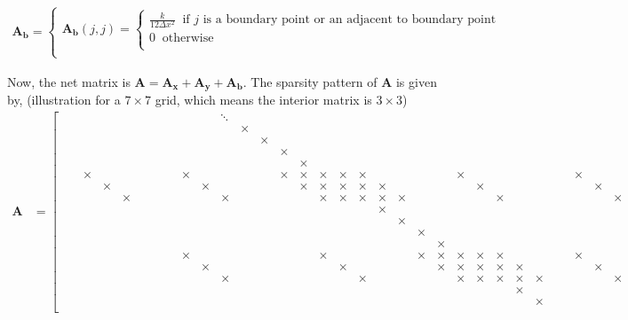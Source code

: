 \documentclass[12 pt, final]{article}
\renewcommand{\d}{\times}
\begin{document}
\begin{itemize}
\begin{itemize}
\begin{enumerate}
\begin{align*}
                    \mathbf{A_b} = \begin{cases}
                    \mathbf{A_b}(j,j) =
                    \begin{cases}
                    \frac{k}{12\Delta x^2} \: \text{ if $j$ is a boundary point or an adjacent to boundary point}\:\\
                    0 \: \text{ otherwise}\:\\
                    \end{cases}\\
                    \end{cases}
            \end{align*}

            Now, the net matrix is $\mathbf{A} = \mathbf{A_x}+\mathbf{A_y}+\mathbf{A_b}$. The sparsity pattern of $\mathbf{A}$ is given by, (illustration for a $7\times7$ grid, which means the interior matrix is $3\times3$)
            \begin{align*}
                \mathbf{A} &= \left[\begin{smallmatrix} 
                &&&&&&&&&&& \ddots\\
                &&&&&&&&&&&& \d\\
                &&&&&&&&&&&&& \d\\
                &&&&&&&&&&&&&& \d\\
                &&&&&&&&&&&&&&& \d\\
                &&\d&&&&&&&\d&&&&&\d&\d&\d&\d&\d&&&&&\d&&&&&&&\d \\
                &&&\d&&&&&&&\d&&&&&\d&\d&\d&\d&\d&&&&&\d&&&&&&&\d \\
                &&&&\d&&&&&&&\d&&&&&\d&\d&\d&\d&\d&&&&&\d&&&&&&&\d \\
                &&&&&&&&&&&&&&&&&&&\d\\
                &&&&&&&&&&&&&&&&&&&&\d\\
                &&&&&&&&&&&&&&&&&&&&&\d\\
                &&&&&&&&&&&&&&&&&&&&&&\d\\
                &&&&&&&&&\d&&&&&&&\d&&&&&\d&\d&\d&\d&\d&&&&&\d&&&&&&&\d \\
                &&&&&&&&&&\d&&&&&&&\d&&&&&\d&\d&\d&\d&\d&&&&&\d&&&&&&&\d \\
                &&&&&&&&&&&\d&&&&&&&\d&&&&&\d&\d&\d&\d&\d&&&&&\d&&&&&&&\d \\
                &&&&&&&&&&&&&&&&&&&&&&&&&& \d\\
                &&&&&&&&&&&&&&&&&&&&&&&&&&& \d\\ 

\end{smallmatrix}
\end{align*}
\end{enumerate}
\end{itemize}
\end{itemize}
\end{document}
